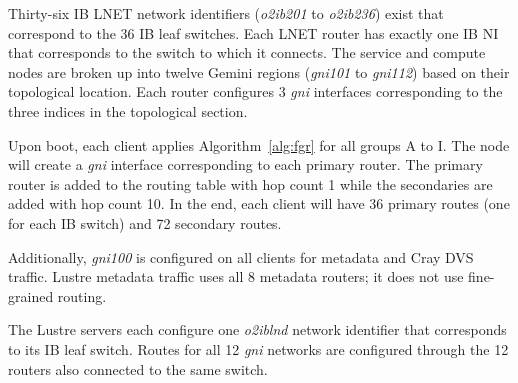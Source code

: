 Thirty-six IB LNET network identifiers (\textit{o2ib201} to \textit{o2ib236})
exist that correspond to the 36 IB leaf switches. Each LNET router has exactly
one IB NI that corresponds to the switch to which it connects.  The service and
compute nodes are broken up into twelve Gemini regions (\textit{gni101} to
\textit{gni112}) based on their topological location.  Each router configures 3
\textit{gni} interfaces corresponding to the three indices in the topological
section.

Upon boot, each client applies Algorithm~\ref{alg:fgr} for all groups A to I.
The node will create a \textit{gni} interface corresponding to each primary
router.  The primary router is added to the routing table with hop count 1
while the secondaries are added with hop count 10.  In the end, each client
will have 36 primary routes (one for each IB switch) and 72 secondary routes.

Additionally, \textit{gni100} is configured on all clients for metadata and
Cray DVS traffic.  Lustre metadata traffic uses all 8 metadata routers; it does
not use fine-grained routing.

The Lustre servers each configure one \textit{o2iblnd} network identifier that
corresponds to its IB leaf switch.  Routes for all 12 \textit{gni} networks are
configured through the 12 routers also connected to the same switch.

